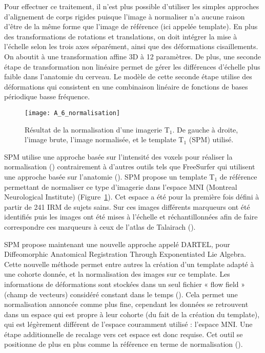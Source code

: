 Pour effectuer ce traitement, il n’est plus possible d’utiliser les simples approches
d’alignement de corps rigides puisque l’image à normaliser n’a aucune raison d’être de la même forme
que l’image de référence (ici appelée template). En plus des transformations de rotations et
translations, on doit intégrer la mise à l’échelle selon les trois axes séparément, ainsi que des
déformations cisaillements. On aboutit à une transformation affine 3D à 12 paramètres. De plus, une
seconde étape de transformation non linéaire permet de gérer les différences d’échelle plus faible
dans l’anatomie du cerveau. Le modèle de cette seconde étape utilise des déformations qui consistent
en une combinaison linéaire de fonctions de bases périodique basse fréquence.

\begin{figure}[!t]
\centering
\texttt{[image: A\_6\_normalisation]}
\caption{Résultat de la normalisation d'une imagerie T$_1$. De gauche à droite, l'image brute, l'image normalisée, et le
template T$_1$ (SPM) utilisé.}
\label{fig:A_6_normalisation}	
\end{figure}
SPM utilise une approche basée sur l’intensité des voxels pour réaliser la normalisation (\cite{Ashburner2003})
contrairement à d’autres outils tels que FreeSurfer qui utilisent une approche basée sur l’anatomie
(\cite{Buckner2004}). SPM propose un template T$_1$ de référence permettant de normaliser ce type d’imagerie dans
l’espace MNI (Montreal Neurological Institute) (Figure~\ref{fig:A_6_normalisation}). Cet espace a été pour la première fois
défini à partir de 241 IRM de sujets sains. Sur ces images différents marqueurs ont été identifiés puis
les images ont été mises à l’échelle et réchantillonnées afin de faire correspondre ces marqueurs à
ceux de l’atlas de Talairach (\cite{Collins1995}).

SPM propose maintenant une nouvelle approche appelé DARTEL, pour Diffeomorphic
Anatomical Registration Through Exponentiated Lie Algebra. Cette nouvelle méthode permet entre
autres la création d’un template adapté à une cohorte donnée, et la normalisation des images sur ce
template. Les informations de déformations sont stockées dans un seul fichier « flow field » (champ de vecteurs) considéré constant dans le temps (\cite{Ashburner2007}). Cela permet une normalisation annoncée comme
plus fine, cependant les données se retrouvent dans un espace qui est propre à leur cohorte (du fait
de la création du template), qui est légèrement différent de l’espace couramment utilisé : l’espace
MNI. Une étape additionnelle de recalage vers cet espace est donc requise. Cet outil se positionne de
plus en plus comme la référence en terme de normalisation (\cite{Klein2009}).
